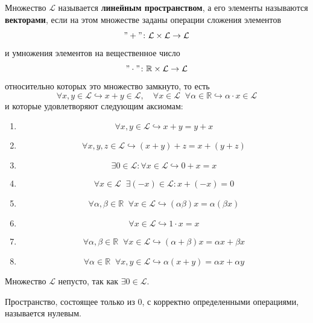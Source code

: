 \documentclass[11pt]{article}
\begin{document}
\begin{definition}
    Множество $\mathcal{L}$ называется \textbf{линейным пространством}, а его элементы
    называются \textbf{векторами}, если на этом множестве заданы операции сложения элементов 
    \["+" \colon \mathcal{L} \times \mathcal{L} \to \mathcal{L}\]
    и умножения элементов на вещественное число
    \["\cdot" \colon \mathbb{R} \times \mathcal{L} \to \mathcal{L}\] 
    относительно которых это множество замкнуто, то есть 
    \[\forall x, y \in \mathcal{L} \hookrightarrow x + y \in \mathcal{L}, \quad
    \forall x \in \mathcal{L} \; \; \forall \alpha \in \mathbb{R} \hookrightarrow \alpha \cdot x \in \mathcal{L}\]
    и которые удовлетворяют следующим аксиомам:
    \begin{enumerate}
        \item \[ \forall x, y \in \mathcal{L} \hookrightarrow x + y = y + x\]
        \item \[ \forall x, y, z \in \mathcal{L} \hookrightarrow (x + y) + z = x + (y + z) \]
        \item \[ \exists 0 \in \mathcal{L} : \forall x \in \mathcal{L} \hookrightarrow 0 + x = x\] 
        \item \[ \forall x \in \mathcal{L} \; \; \exists (-x) \in \mathcal{L} : x + (-x) = 0\]
        \item \[ \forall \alpha, \beta \in \mathbb{R} \; \; \forall x \in \mathcal{L}
        \hookrightarrow (\alpha \beta) x = \alpha (\beta x) \]
        \item \[ \forall x \in \mathcal{L} \hookrightarrow 1 \cdot x = x\]
        \item \[ \forall \alpha, \beta \in \mathbb{R} \; \; \forall x \in \mathcal{L} 
        \hookrightarrow (\alpha + \beta) x = \alpha x + \beta x \]
        \item \[ \forall \alpha \in \mathbb{R} \; \; \forall x, y \in \mathcal{L} 
        \hookrightarrow \alpha (x + y) = \alpha x + \alpha y \]
    \end{enumerate}
\end{definition}

\begin{remark}
    Множество $\mathcal{L}$ непусто, так как $\exists 0 \in \mathcal{L}$.
\end{remark}

\begin{definition}
    Пространство, состоящее только из $0$, с корректно определенными операциями,
    называется нулевым.
\end{definition}
\end{document}
